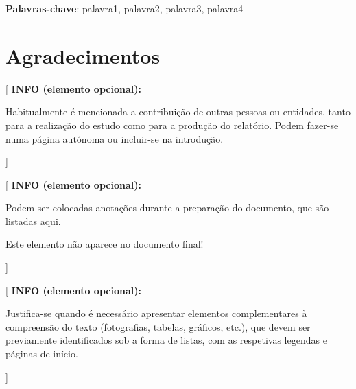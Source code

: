 \documentclass[11pt,a4paper]{report}
\newenvironment{infoopt}[1]{\vspace*{6mm}\color{blue}[ \textbf{INFO (elemento opcional):} \begin{em} #1}
                        {\vspace*{3mm}\end{em} ]}
\begin{document}

\vspace{\fill}
{\Large \textbf{Palavras-chave}:} palavra1, palavra2, palavra3, palavra4
\vspace*{24mm}


\chapter*{Agradecimentos}

\begin{infoopt}
Habitualmente é mencionada a contribuição de outras pessoas ou
entidades, tanto para a realização do estudo como para a produção do
relatório. 
Podem fazer-se numa página autónoma ou incluir-se na introdução.
\end{infoopt}


\tableofcontents


\listoftodos

\begin{infoopt}
Podem ser colocadas anotações durante a preparação do documento, que
são listadas aqui.

Este elemento não aparece no documento final!
\end{infoopt}


\listoffigures

\begin{infoopt}
Justifica-se quando é necessário apresentar elementos complementares à
compreensão do texto (fotografias, tabelas, gráficos, etc.), que devem
ser previamente identificados sob a forma de listas, com as respetivas
legendas e páginas de início. 
\end{infoopt}


\listoftables
\end{document}
